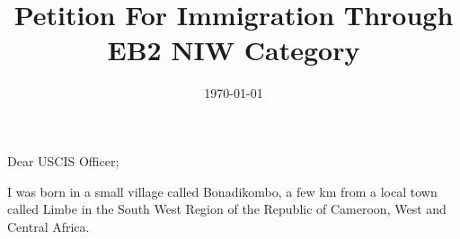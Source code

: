 \documentclass[12pt]{letter}
\begin{document}
\date{\today}



Dear USCIS Officer;

\title{Petition For Immigration Through EB2 NIW Category}

I was born in a small village called Bonadikombo, a few km from a local town called Limbe
in the South West Region of the Republic of Cameroon, West and Central Africa.
\end{document}
